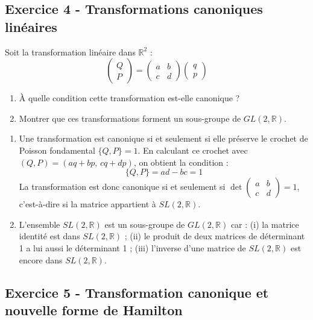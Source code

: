 \documentclass[12pt,a4paper]{article}
\begin{document}
\subsection*{Exercice 4 - Transformations canoniques linéaires \niveau{\moyen}}

\begin{boiteexercice}
Soit la transformation linéaire dans $\mathbb{R}^2$ :
\[
  \begin{pmatrix} Q \\ P \end{pmatrix}
  = \begin{pmatrix} a & b \\ c & d \end{pmatrix}
  \begin{pmatrix} q \\ p \end{pmatrix}
\]
\begin{enumerate}
  \item À quelle condition cette transformation est-elle canonique ?
  \item Montrer que ces transformations forment un sous-groupe de $GL(2,\mathbb{R})$.
\end{enumerate}
\end{boiteexercice}

\begin{boitecorrige}
\begin{enumerate}
  \item Une transformation est canonique si et seulement si elle préserve le crochet de Poisson fondamental $\{Q, P\} = 1$. En calculant ce crochet avec $(Q,P) = (aq+bp,\, cq+dp)$, on obtient la condition :
  \[
    \{Q,P\} = ad - bc = 1
  \]
  La transformation est donc canonique si et seulement si $\det\!\begin{pmatrix} a & b \\ c & d \end{pmatrix} = 1$, c'est-à-dire si la matrice appartient à $SL(2,\mathbb{R})$.

  \item L'ensemble $SL(2,\mathbb{R})$ est un sous-groupe de $GL(2,\mathbb{R})$ car : (i) la matrice identité est dans $SL(2,\mathbb{R})$ ; (ii) le produit de deux matrices de déterminant 1 a lui aussi le déterminant 1 ; (iii) l'inverse d'une matrice de $SL(2,\mathbb{R})$ est encore dans $SL(2,\mathbb{R})$.
\end{enumerate}
\end{boitecorrige}

\subsection*{Exercice 5 - Transformation canonique et nouvelle forme de Hamilton \niveau{\difficile}}
\end{document}
